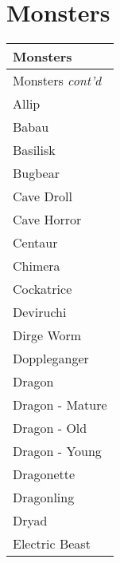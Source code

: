 \documentclass[twoside]{book}
\begin{document}
\section{Monsters}
    
\begin{longtable}{p{1.25in}} 
  Monsters
  \\
  \hline
  \hline
  \endfirsthead
  Monsters \textit{cont'd}
        
  \\
  \hline
  \endhead
      
  \raggedright
           Allip 
  \tabularnewline
      
  \raggedright
           Babau 
  \tabularnewline
      
  \raggedright
           Basilisk 
  \tabularnewline
      
  \raggedright
           Bugbear 
  \tabularnewline
      
  \raggedright
           Cave Droll 
  \tabularnewline
      
  \raggedright
           Cave Horror 
  \tabularnewline
      
  \raggedright
           Centaur 
  \tabularnewline
      
  \raggedright
           Chimera 
  \tabularnewline
      
  \raggedright
           Cockatrice 
  \tabularnewline
      
  \raggedright
           Deviruchi 
  \tabularnewline
      
  \raggedright
           Dirge Worm 
  \tabularnewline
      
  \raggedright
           Doppleganger 
  \tabularnewline
      
  \raggedright
           Dragon 
  \tabularnewline
      
  \raggedright
           Dragon - Mature 
  \tabularnewline
      
  \raggedright
           Dragon - Old 
  \tabularnewline
      
  \raggedright
           Dragon - Young 
  \tabularnewline
      
  \raggedright
           Dragonette 
  \tabularnewline
      
  \raggedright
           Dragonling 
  \tabularnewline
      
  \raggedright
           Dryad 
  \tabularnewline
      
  \raggedright
           Electric Beast 
  \tabularnewline
      

\end{longtable}
\end{document}
